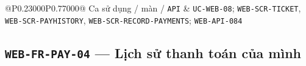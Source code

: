 \begin{longtable}{@{}P{0.23000\SRSWidth}P{0.77000\SRSWidth}@{}}
Ca sử dụng /\allowbreak{} màn /\allowbreak{} \texttt{API} & \texttt{UC-\allowbreak{}WEB-\allowbreak{}08}; \texttt{WEB-\allowbreak{}SCR-\allowbreak{}TICKET}, \texttt{WEB-\allowbreak{}SCR-\allowbreak{}PAYHISTO\allowbreak{}RY}, \texttt{WEB-\allowbreak{}SCR-\allowbreak{}RECORD-\allowbreak{}PAYMENTS\allowbreak{}}; \texttt{WEB-\allowbreak{}API-\allowbreak{}084} \\[3pt]
\end{longtable}
\endgroup

\subsection{\texttt{WEB-\allowbreak{}FR-\allowbreak{}PAY-\allowbreak{}04} — Lịch sử thanh toán của mình}
\begingroup
\fontsize{9.5}{12}\selectfont
\setlength{\SRSWidth}{\dimexpr\linewidth-2\tabcolsep\relax}
